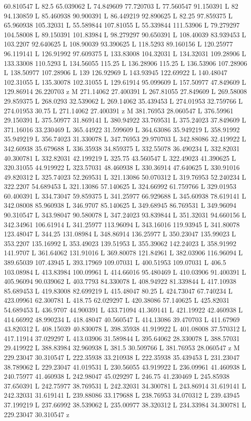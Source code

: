 {\begin{scope}[local bounding box=bb]
{60.810547 L 82.5 65.039062 L 74.849609 77.720703 L 77.560547 91.150391 L 82 94.130859 L 85.460938 90.900391 L 86.449219 92.890625 L 82.25 97.859375 L 65.960938 105.32031 L 55.589844 107.81055 L 55.339844 111.53906 L 79.279297 104.58008 L 89.150391 101.83984 L 98.279297 90.650391 L 108.40039 83.939453 L 103.2207 92.640625 L 108.90039 93.390625 L 118.5293 89.160156 L 120.25977 96.119141 L 126.91992 97.609375 L 133.83008 104.32031 L 134.32031 109.28906 L 133.33008 110.5293 L 134.56055 115.25 L 136.28906 115.25 L 136.53906 107.28906 L 138.50977 107.28906 L 139 126.92969 L 143.93945 122.69922 L 140.48047 102.31055 L 135.30078 102.31055 L 129.61914 95.099609 L 157.50977 47.849609 L 129.86914 26.220703 z M 271.14062 27.400391 L 267.81055 27.849609 L 269.58008 29.859375 L 268.0293 32.539062 L 269.14062 35.439453 L 274.01953 32.759766 L 274.01953 30.75 L 271.14062 27.400391 z M 381.76953 28.060547 L 376.59961 29.150391 L 375.50977 31.869141 L 380.94922 33.769531 L 375.24023 37.849609 L 371.16016 33.230469 L 365.44922 31.599609 L 364.63086 35.949219 L 358.91992 35.949219 L 356.74023 31.330078 L 347.76953 29.970703 L 342.88086 32.419922 L 342.60938 35.679688 L 336.35938 34.859375 L 332.55078 36.490234 L 332.82031 40.300781 L 332.82031 42.199219 L 325.75 43.560547 L 322.49023 41.390625 L 320.31055 44.919922 L 323.57031 48.460938 L 330.36914 47.640625 L 330.91016 49.820312 L 325.74023 52.269531 L 321.13086 50.070312 L 319.76953 52.240234 L 322.2207 54.689453 L 321.13086 57.140625 L 324.66992 61.759766 L 329.01953 60.400391 L 334.73047 59.859375 L 341.25977 66.929688 L 345.60938 78.619141 L 342.08008 85.960938 L 346.9707 85.140625 L 349.68945 86.769531 L 349.96094 90.310547 L 343.98047 90.580078 L 347.24023 93.839844 L 351.32031 94.660156 L 342.34961 106.61914 L 341.25977 113.96094 L 343.16016 119.93945 L 341.80078 123.48047 L 344.25 131.08984 L 348.86914 136.25977 L 350.23047 135.99023 L 353.2207 135.16992 L 353.49023 139.51953 L 355.39062 142.24023 L 358.91992 141.9707 L 361.64062 131.91016 L 369.80078 121.84961 L 382.03906 116.96094 L 389.65039 107.43945 L 393.17969 109.07031 L 400.51953 109.07031 L 406.5 103.08984 L 413.83984 100.09961 L 414.66016 95.480469 L 410.03906 91.400391 L 405.96094 90.039062 L 403.7793 84.330078 L 408.94922 81.339844 L 417.10938 85.689453 L 419.83008 82.699219 L 415.48047 80.25 L 424.73047 67.740234 L 423.09961 62.300781 L 418.75 62.029297 L 420.38086 57.140625 L 425.82031 54.689453 L 436.9707 44.900391 L 433.71094 41.369141 L 421.19922 42.460938 L 414.66992 48.990234 L 418.48047 40.560547 L 414.13086 39.470703 L 411.67969 43.820312 L 408.15039 40.830078 L 398.35938 41.919922 L 401.08008 37.570312 L 417.11914 37.029297 L 413.03906 31.589844 L 395.64062 28.330078 L 388.57031 29.419922 L 388.83984 32.960938 L 381.5 30.509766 L 381.76953 28.060547 z M 229.23047 30.310547 L 222.35938 33.210938 L 222.35938 35.439453 L 231.23047 38.789062 L 229.23047 41.019531 L 230.56055 43.919922 L 236.09961 41.460938 L 240.75977 41.460938 L 242.98047 45.029297 L 246.75 41.230469 L 245.85938 37.650391 L 242.75977 38.769531 L 242.32031 34.300781 L 243.86914 31.619141 L 242.32031 31.619141 L 239.88086 33.179688 L 238.76953 34.070312 L 239.43945 37.199219 L 237.66992 38.539062 L 235.00977 38.320312 L 234.33984 34.300781 L 229.23047 30.310547 z }
\end{scope}}
